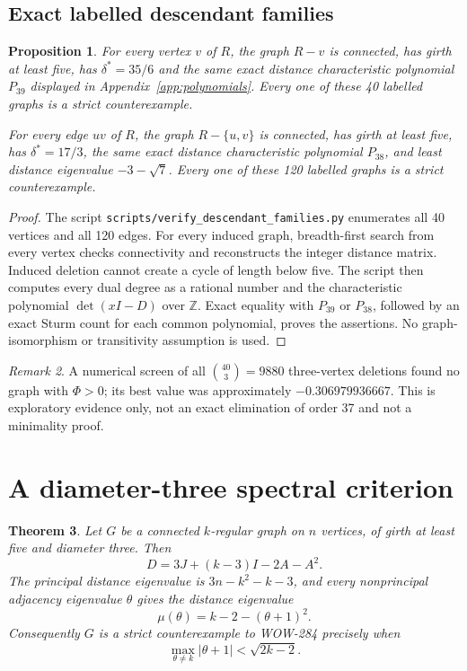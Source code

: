 \documentclass[a4paper,11pt,reqno]{amsart}
\theoremstyle{plain}
\newtheorem{theorem}{Theorem}[section]
\newtheorem{proposition}[theorem]{Proposition}
\theoremstyle{definition}
\theoremstyle{remark}
\newtheorem{remark}[theorem]{Remark}
\begin{document}
\subsection{Exact labelled descendant families}

\begin{proposition}\label{prop:descendants}
For every vertex \(v\) of \(R\), the graph \(R-v\) is connected, has girth at
least five, has
\(\delta^*=35/6\) and the same exact distance characteristic polynomial
\(P_{39}\) displayed in Appendix~\ref{app:polynomials}.  Every one of these
40 labelled graphs is a strict counterexample.

For every edge \(uv\) of \(R\), the graph \(R-\{u,v\}\) is connected, has
girth at least five, has
\(\delta^*=17/3\), the same exact distance characteristic polynomial
\(P_{38}\), and least distance eigenvalue \(-3-\sqrt7\).  Every one of
these 120 labelled graphs is a strict counterexample.
\end{proposition}

\begin{proof}
The script \texttt{scripts/verify\_descendant\_families.py} enumerates all
40 vertices and all 120 edges.  For every induced graph, breadth-first search
from every vertex checks connectivity and reconstructs the integer distance
matrix.  Induced deletion cannot create a cycle of length below five.  The
script then computes every dual degree as a rational number and the
characteristic polynomial \(\det(xI-D)\) over \(\mathbb Z\).  Exact equality
with \(P_{39}\) or \(P_{38}\), followed by an exact Sturm count for each
common polynomial, proves the assertions.  No graph-isomorphism or
transitivity assumption is used.
\end{proof}

\begin{remark}
A numerical screen of all \(\binom{40}{3}=9880\) three-vertex deletions found
no graph with \(\Phi>0\); its best value was approximately
\(-0.306979936667\).
This is exploratory evidence only, not an exact elimination of order 37 and
not a minimality proof.
\end{remark}

\section{A diameter-three spectral criterion}\label{sec:diam3}

\begin{theorem}\label{thm:diam3}
Let \(G\) be a connected \(k\)-regular graph on \(n\) vertices, of girth at
least five and diameter three.  Then
\begin{equation}\label{eq:diam3-polynomial}
 D=3J+(k-3)I-2A-A^2.
\end{equation}
The principal distance eigenvalue is \(3n-k^2-k-3\), and every nonprincipal
adjacency eigenvalue \(\theta\) gives the distance eigenvalue
\[
 \mu(\theta)=k-2-(\theta+1)^2.
\]
Consequently \(G\) is a strict counterexample to WOW-284 precisely when
\[
 \max_{\theta\ne k}|\theta+1|<\sqrt{2k-2}.
\]
\end{theorem}
\end{document}
